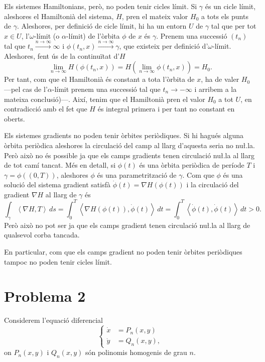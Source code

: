 \documentclass[12pt]{report}
\numberwithin{table}{section}
\numberwithin{equation}{section}
\numberwithin{figure}{section}
\newcommand{\inn}[2]{\left\langle #1 , #2 \right\rangle}
\begin{document}
\begin{enumerate}[label=(\roman*), font=\bfseries \sffamily, wide, labelwidth=!, labelindent=0pt]
		Els sistemes Hamiltonians, però, no poden tenir cicles límit. Si \( \gamma \) és un cicle límit, aleshores el Hamiltonià del sistema, \( H \), pren el mateix valor \( H_0 \) a tots els punts de \( \gamma \). Aleshores, per definició de cicle límit, hi ha un entorn \( U \) de \( \gamma \) tal que per tot \( x \in U \), l'\( \omega \)-límit (o \( \alpha \)-límit) de l'òrbita \( \phi \) de \( x \) és \( \gamma \). Prenem una successió \( (t_n) \) tal que \( t_n \xrightarrow{n \to \infty} \infty \) i \( \phi(t_n, x) \xrightarrow{n \to \infty} \gamma \), que existeix per definició d'\( \omega \)-límit. Aleshores, fent ús de la continuïtat d'\( H \)
		\begin{equation*}
			\lim_{n \to \infty}{H(\phi(t_n, x))} = H\left(\lim_{n \to \infty}{\phi(t_n, x)}\right) = H_0.
		\end{equation*}
		Per tant, com que el Hamiltonià és constant a tota l'òrbita de \( x \), ha de valer \( H_0 \) ---pel cas de l'\( \alpha \)-límit prenem una successió tal que \( t_n \to -\infty \) i arribem a la mateixa conclusió)---. Així, tenim que el Hamiltonià pren el valor \( H_0 \) a tot \( U \), en contradicció amb el fet que \( H \) és integral primera i per tant no constant en oberts. 

		Els sistemes gradients no poden tenir òrbites periòdiques. Si hi hagués alguna òrbita periòdica aleshores la circulació del camp al llarg d'aquesta seria no nu\l.la. Però això no és possible ja que els camps gradients tenen circulació nu\l.la al llarg de tot camí tancat. Més en detall, si \( \phi(t) \) és una òrbita periòdica de període \( T \) i \( \gamma = \phi((0, T)) \), aleshores \( \phi \) és una parametrització de \( \gamma \). Com que \( \phi \) és una solució del sistema gradient satisfà \( \dot{\phi}(t) = \nabla H(\phi(t)) \) i la circulació del gradient \( \nabla H \) al llarg de \( \gamma \) és
		\begin{equation*}
			\int_{\gamma} \inn{\nabla H}{T} \, ds = \int_{0}^{T} \inn{\nabla H(\phi(t))}{\dot{\phi}(t)} \, dt = \int_0^T \inn{\dot{\phi}(t)}{\dot{\phi}(t)} \, dt > 0.
		\end{equation*}
		Però això no pot ser ja que els camps gradient tenen circulació nu\l.la al llarg de qualsevol corba tancada.

		En particular, com que els camps gradient no poden tenir òrbites periòdiques tampoc no poden tenir cicles límit.
\end{enumerate}

\section*{Problema 2}
Considerem l'equació diferencial 
\begin{equation*}
	\left\{ 
		\begin{aligned}
			\dot{x} & = P_n(x,y) \\
			\dot{y} & = Q_n(x,y),
		\end{aligned} 
	\right. 
\end{equation*}
on \( P_n(x,y) \) i \( Q_n(x,y) \) són polinomis homogenis de grau \( n \). 
\end{document}
